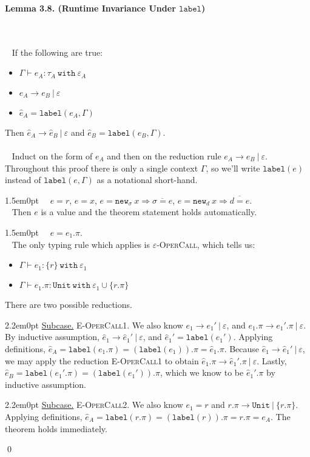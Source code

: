 \documentclass{llncs}
\newcommand{\keywadj}[1]{\mathtt{#1}}
\newcommand{\keyw}[1]{\keywadj{#1}~}
\newcommand{\thm}[3]{
	\begin{large}
		\bf{#1}
	\end{large} \\\\
	\fbox{Statement.} ~ #2
	\fbox{Proof.}~ #3 \qed
}
\newcommand{\proofcase}[2]{
	\begin{adjustwidth}{1.5em}{0pt}
		\fbox{Case.}~~#1. \\ ~#2
	\end{adjustwidth}
}
\newcommand{\subcase}[1] {
	\begin{adjustwidth}{2.2em}{0pt}
		\underline{Subcase.} #1
	\end{adjustwidth}
}
\newcommand{\type}[2]{
	#1~\keyw{with} #2
}
\newcommand{\newd}[0]{
	\keywadj{new}_d~x \Rightarrow \overline{d = e}
}
\newcommand{\newsig}[0]{
	\keywadj{new}_\sigma~x \Rightarrow \overline{\sigma = e}
}
\begin{document}
\noindent
\thm{Lemma 3.8. (Runtime Invariance Under $\keywadj{label}$)}
{If the following are true:
	\begin{itemize}
	\item $\Gamma \vdash e_A : \type{\tau_A}{\varepsilon_A}$
	\item $e_A \longrightarrow e_B~|~\varepsilon$
	\item $\hat e_A = \keywadj{label}(e_A, \Gamma)$
	\end{itemize}
Then $\hat e_A \longrightarrow \hat e_B~|~\varepsilon$ and $\hat e_B = \keywadj{label}(e_B, \Gamma)$.\\\\
}
{Induct on the form of $e_A$ and then on the reduction rule $e_A \longrightarrow e_B~|~\varepsilon$. Throughout this proof there is only a single context $\Gamma$, so we'll write $\keywadj{label}(e)$ instead of $\keywadj{label}(e, \Gamma)$ as a notational short-hand.\\

\proofcase{$e=r$, $e=x$, $e=\newsig$, $e=\newd$}{
	Then $e$ is a value and the theorem statement holds automatically.\\
}

\proofcase{$e=e_1.\pi$}{
The only typing rule which applies is \textsc{$\varepsilon$-OperCall}, which tells us:
	\begin{itemize}
		\item $\Gamma \vdash e_1 : \type{ \{ r \} }{\varepsilon_1}$
		\item $\Gamma \vdash e_1.\pi : \type{\keywadj{Unit}}{\varepsilon_1 \cup \{ r.\pi \}}$
	\end{itemize}
\noindent
There are two possible reductions. \\

\subcase{\textsc{E-OperCall1}. We also know $e_1 \longrightarrow e_1'~|~\varepsilon$, and $e_1.\pi \longrightarrow e_1'.\pi~|~\varepsilon$. By inductive assumption, $\hat e_1 \longrightarrow \hat e_1'~|~\varepsilon$, and $\hat e_1' = \keywadj{label}(e_1')$. Applying definitions, $\hat e_A = \keywadj{label}(e_1.\pi) = (\keywadj{label}(e_1)).\pi = \hat e_1.\pi$. Because $\hat e_1 \longrightarrow \hat e_1'~|~\varepsilon$, we may apply the reduction \textsc{E-OperCall1} to obtain $\hat e_1.\pi \longrightarrow \hat e_1'.\pi~|~\varepsilon$. Lastly, $\hat e_B = \keywadj{label}(e_1'.\pi) = (\keywadj{label}(e_1')).\pi$, which we know to be $\hat e_1'.\pi$ by inductive assumption.\\
}

\subcase{\textsc{E-OperCall2}. We also know $e_1 = r$ and $r.\pi \longrightarrow \keywadj{Unit}~|~\{ r.\pi \}$. Applying definitions, $\hat e_A = \keywadj{label}(r.\pi) = (\keywadj{label}(r)).\pi = r.\pi = e_A$. The theorem holds immediately.\\

}}}
\end{document}
